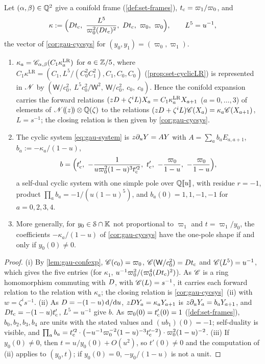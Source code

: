 \begin{prop}
\label{prop:gau-quintic}
Let $(\alpha,\beta)\in\mathbb{Q}^2$ give a conifold frame (\cref{def:set-frames}), $t_{\mathrm{c}}=\varpi_1/\varpi_0$, and
\[
\kappa:=\Bigl(\Dq\tc,\ \frac{L^5}{\varpi_0^2(\Dq\tc)^2},\ \Dq\tc,\ \varpi_0,\ \varpi_0\Bigr),\qquad L^5=u^{-1},
\]
the vector of \cref{cor:gau-cycsys} for $(y_0,y_1)=(\varpi_0,\varpi_1)$.
\begin{enumerate}
\item $\kappa_a=\mathscr{C}_{\alpha,\beta}(C_1\kappa^{\mathrm{LR}}_a)$ for $a\in\mathbb{Z}/5$, where $C_1\kappa^{\mathrm{LR}}=(C_1,L^5/(C_0^2C_1^2),C_1,C_0,C_0)$ (\cref{prop:set-cyclicLR}) is represented in $\mathscr{N}$ by $(\mathsf W/c_0^2,\ L^5c_0^2/\mathsf W^2,\ \mathsf W/c_0^2,\ c_0,\ c_0)$. Hence the conifold expansion carries the forward relations $(zD+\zeta^iL)X_a=C_1\kappa^{\mathrm{LR}}_aX_{a+1}$ ($a=0,\dots,3$) of elements of $\mathscr{N}(\!(z)\!)\otimes\mathbb{Q}(\zeta)$ to the relations $(zD+\zeta^iL)\mathscr{C}(X_a)=\kappa_a\mathscr{C}(X_{a+1})$, $L=s^{-1}$; the closing relation is then given by \cref{cor:gau-cycsys}.
\item The cyclic system \eqref{eq:gau-system} is $z\partial_uY=AY$ with $A=\sum_ab_aE_{a,a+1}$, $b_a:=-\kappa_a/(1-u)$,
\[
b=\Bigl(\tc',\ -\frac1{u\varpi_0^2(1-u)^3\tc'^2},\ \tc',\ -\frac{\varpi_0}{1-u},\ -\frac{\varpi_0}{1-u}\Bigr),
\]
a self-dual cyclic system with one simple pole over $\mathbb{Q}[\![ u ]\!]$, with residue $r=-1$, product $\prod_ab_a=-1/(u(1-u)^5)$, and $b_a(0)=1,1,-1,-1$ for $a=0,2,3,4$.
\item More generally, for $y_0\in\mathcal S\cap\mathbb{K}$ not proportional to $\varpi_1$ and $t=\varpi_1/y_0$, the coefficients $-\kappa_a/(1-u)$ of \cref{cor:gau-cycsys} have the one-pole shape if and only if $y_0(0)\neq0$.
\end{enumerate}
\end{prop}

\begin{proof}
(i) By \cref{lem:gau-confexp}, $\mathscr{C}(c_0)=\varpi_0$, $\mathscr{C}(\mathsf W/c_0^2)=Dt_{\mathrm{c}}$ and $\mathscr{C}(L^5)=u^{-1}$, which gives the five entries (for $\kappa_1$, $u^{-1}\varpi_0^2/(\varpi_0^4(Dt_{\mathrm{c}})^2)$). As $\mathscr{C}$ is a ring homomorphism commuting with $D$, with $\mathscr{C}(L)=s^{-1}$, it carries each forward relation to the relation with $\kappa_a$; the closing relation is \cref{cor:gau-cycsys}~(ii) with $w=\zeta^is^{-1}$. (ii) As $D=-(1-u)\,\mathrm{d}/\mathrm{d} u$, $zD Y_a=\kappa_aY_{a+1}$ is $z\partial_uY_a=b_aY_{a+1}$, and $Dt_{\mathrm{c}}=-(1-u)t_{\mathrm{c}}'$, $L^5=u^{-1}$ give $b$. As $\varpi_0(0)=t_{\mathrm{c}}'(0)=1$ (\cref{def:set-frames}), $b_0,b_2,b_3,b_4$ are units with the stated values and $(ub_1)(0)=-1$; self-duality is visible, and $\prod_ab_a=t_{\mathrm{c}}'^2\cdot\bigl(-u^{-1}\varpi_0^{-2}(1-u)^{-3}t_{\mathrm{c}}'^{-2}\bigr)\cdot\varpi_0^2(1-u)^{-2}$. (iii) If $y_0(0)\neq0$, then $t=u/y_0(0)+O(u^2)$, so $t'(0)\neq0$ and the computation of (ii) applies to $(y_0,t)$; if $y_0(0)=0$, $-y_0/(1-u)$ is not a unit.
\end{proof}

